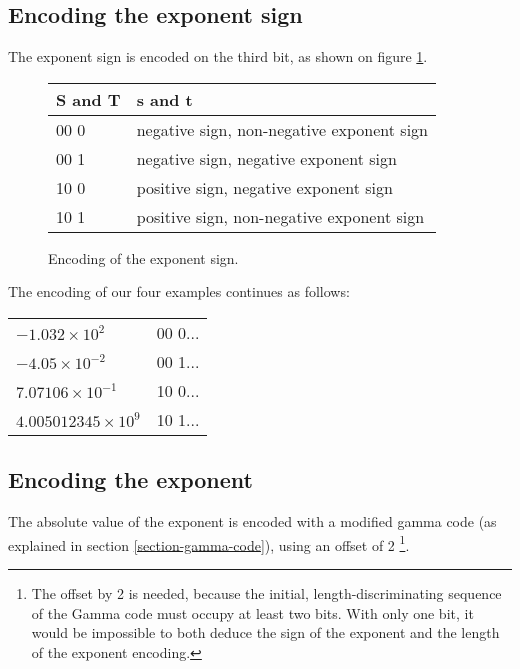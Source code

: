 \documentclass{acm_proc_article-sp}
\begin{document}
\subsection{Encoding the exponent sign}

The exponent sign is encoded on the third bit, as shown on figure \ref{figure-exponent-sign}.

\begin{figure}[p]
\caption{Encoding of the exponent sign.}
\label{figure-exponent-sign}
\center
\begin{tabular}{|l|l|}
\hline
S and T & s and t \\
\hline
00 0 &  negative sign, non-negative exponent sign\\
\hline
00 1 & negative sign, negative exponent sign\\
\hline
10 0 & positive sign, negative exponent sign\\
\hline
10 1 & positive sign, non-negative exponent sign\\
\hline
\end{tabular}
\end{figure}

The encoding of our four examples continues as follows:

\begin{tabular}{l|l}
$- 1.032 \times 10^2$ & 00 0... \\

$-4.05 \times 10^{-2}$ & 00 1... \\

$7.07106 \times 10^{-1}$ & 10 0... \\

$4.005012345 \times 10^9$ & 10 1...\\
\end{tabular}

\vspace{10pt}
\subsection{Encoding the exponent}

The absolute value of the exponent is encoded with a modified gamma code (as explained in section \ref{section-gamma-code}), using an offset of 2 \footnote{The offset by 2 is needed, because the initial, length-discriminating sequence of the Gamma code must occupy at least two bits. With only one bit, it would be impossible to both deduce the sign of the exponent and the length of the exponent encoding.}.
\end{document}
